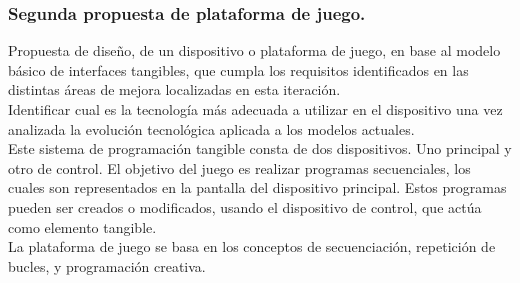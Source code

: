 \subsubsection{Segunda propuesta de plataforma de juego.}

Propuesta de diseño, de un dispositivo o plataforma de juego, en base al modelo básico de interfaces tangibles, que cumpla los requisitos identificados en las distintas áreas de mejora localizadas en esta iteración.\\
Identificar cual es la tecnología más adecuada a utilizar en el dispositivo una vez analizada la evolución tecnológica aplicada a los modelos actuales.\\

Este sistema de programación tangible consta de dos dispositivos. Uno principal y otro de control. El objetivo del juego es realizar programas secuenciales, los cuales son representados en la pantalla del dispositivo principal. Estos programas pueden ser creados o modificados, usando el dispositivo de control, que actúa como elemento tangible.\\

La plataforma de juego se basa en los conceptos de secuenciación, repetición de bucles, y programación creativa.

